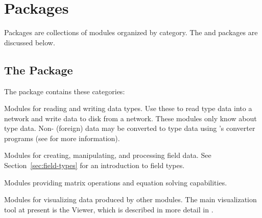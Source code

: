 %
%
%
%
%
%

\section{Packages}
\label{sec:packages}

Packages are collections of modules organized by category. The \SR{} and 
packages are discussed below. 

\subsection{The \sr{} Package}
\label{sec:srpackage}

The \sr{} package contains these categories:

\begin{description}
   Modules for reading and writing \sr{}
  data types.  Use these to read \sr{} type data into a network and
  write data to disk from a network.  These modules only know about
  \sr{} type data.  Non-\sr{} (foreign) data may be converted to \sr{}
  type data using \sr{}'s converter programs (see  for more information).
  
 Modules for creating, manipulating, and
  processing field data.  See Section~\ref{sec:field-types} for an
  introduction to \sr{} field types.
  
 Modules providing matrix operations and
  equation solving capabilities.
  
 Modules for visualizing data produced by
  other modules.  The main visualization tool at present
  is the Viewer, which is described in more detail in
  .
\end{description}

